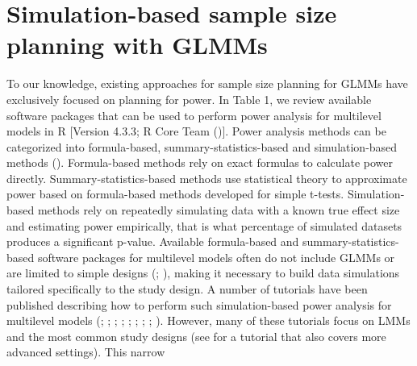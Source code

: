 \documentclass[
  man,
  floatsintext,
  longtable,
  a4paper,
  nolmodern,
  notxfonts,
  notimes,
  colorlinks=true,linkcolor=blue,citecolor=blue,urlcolor=blue]{apa7}
\begin{document}
\section{Simulation-based sample size planning with
GLMMs}\label{simulation-based-sample-size-planning-with-glmms}

To our knowledge, existing approaches for sample size planning for GLMMs
have exclusively focused on planning for power. In Table 1, we review
available software packages that can be used to perform power analysis
for multilevel models in R {[}Version 4.3.3; R Core Team
(){]}. Power analysis methods can be
categorized into formula-based, summary-statistics-based and
simulation-based methods
(). Formula-based methods rely on exact formulas to
calculate power directly. Summary-statistics-based methods use
statistical theory to approximate power based on formula-based methods
developed for simple t-tests. Simulation-based methods rely on
repeatedly simulating data with a known true effect size and estimating
power empirically, that is what percentage of simulated datasets
produces a significant p-value. Available formula-based and
summary-statistics-based software packages for multilevel models often
do not include GLMMs or are limited to simple designs
(;
), making it necessary to build data simulations tailored
specifically to the study design. A number of tutorials have been
published describing how to perform such simulation-based power analysis
for multilevel models
(; ;
; ; ; ; ; ; ). However, many of these tutorials focus on LMMs and the most
common study designs (see
for a tutorial that also covers more advanced settings). This narrow
\end{document}
